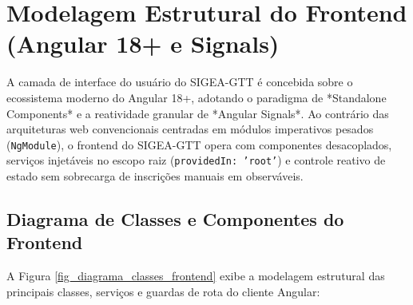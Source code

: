 \chapter{Modelagem Estrutural do Frontend (Angular 18+ e Signals)}
\label{cap_modelagem_frontend}

A camada de interface do usuário do SIGEA-GTT é concebida sobre o ecossistema moderno do Angular 18+, adotando o paradigma de *Standalone Components* e a reatividade granular de *Angular Signals*. Ao contrário das arquiteturas web convencionais centradas em módulos imperativos pesados (\texttt{NgModule}), o frontend do SIGEA-GTT opera com componentes desacoplados, serviços injetáveis no escopo raiz (\texttt{providedIn: 'root'}) e controle reativo de estado sem sobrecarga de inscrições manuais em observáveis.

\section{Diagrama de Classes e Componentes do Frontend}
\label{sec_diagrama_classes_frontend}

A Figura \ref{fig_diagrama_classes_frontend} exibe a modelagem estrutural das principais classes, serviços e guardas de rota do cliente Angular:

